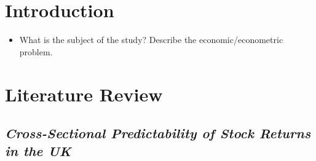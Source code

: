 \documentclass[a4paper,12pt]{article}
\providecommand{\tightlist}{%
  \setlength{\itemsep}{0pt}\setlength{\parskip}{0pt}}
\begin{document}
\newpage
\listoffigures
{}

\newpage
\listoftables
{}

\newpage
\pagestyle{plain}       
\setcounter{page}{1}    %

\hypertarget{introduction}{%
\section{Introduction}\label{introduction}}
\begin{itemize}
\tightlist
\item
  What is the subject of the study? Describe the economic/econometric problem.
\end{itemize}
\hypertarget{literature-review}{%
\section{Literature Review}\label{literature-review}}

\hypertarget{cross-sectional-predictability-of-stock-returns-in-the-uk}{%
\subsection{\texorpdfstring{\emph{Cross-Sectional Predictability of Stock Returns in the UK}}{Cross-Sectional Predictability of Stock Returns in the UK}}\label{cross-sectional-predictability-of-stock-returns-in-the-uk}}
\end{document}
